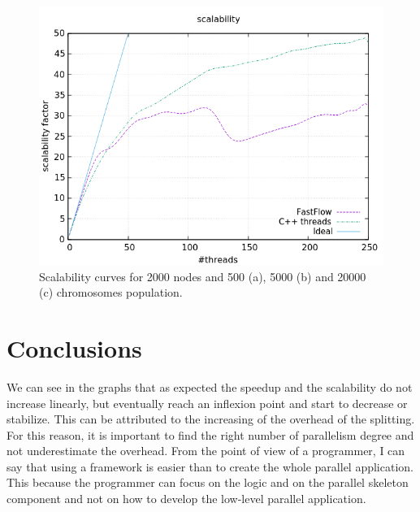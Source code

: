 \documentclass[a4paper,10pt]{article}
\begin{document}
\begin{figure}[H]
			\begin{minipage}[t]{0.32\linewidth}
				\includegraphics[width=\linewidth]{BenchMarkTSP/scalability/2000/SC200020000_zoom.png}
				\subcaption{}
			\end{minipage}
			\caption{Scalability curves for 2000 nodes and 500 (a), 5000 (b) and 20000 (c) chromosomes population.}
			\label{2000s}
		\end{figure}



\section{Conclusions}
We can see in the graphs that as expected the speedup and the scalability do not increase linearly, but eventually reach an inflexion point and start to decrease or stabilize. This can be attributed to the increasing of the overhead of the splitting. For this reason, it is important to find the right number of parallelism degree and not underestimate the overhead. From the point of view of a programmer, I can say that using a framework is easier than to create the whole parallel application. This because the programmer can focus on the logic and on the parallel skeleton component and not on how to develop the low-level parallel application. 
\end{document}
